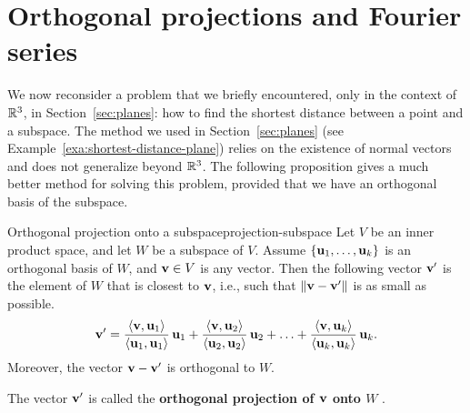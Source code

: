 \section{Orthogonal projections and Fourier series}

We now reconsider a problem that we briefly encountered, only in the
context of $\mathbb{R}^3$, in Section~\ref{sec:planes}: how to find the
shortest distance between a point and a subspace. The method we used
in Section~\ref{sec:planes} (see
Example~\ref{exa:shortest-distance-plane}) relies on the existence of
normal vectors and does not generalize beyond $\mathbb{R}^3$. The following
proposition gives a much better method for solving this problem,
provided that we have an orthogonal basis of the subspace.

\begin{proposition}{Orthogonal projection onto a subspace}{projection-subspace}
  Let $V$ be an inner product space, and let $W$ be a subspace of
  $V$. Assume $\set{\vect{u}_1,\ldots,\vect{u}_k}$ is an orthogonal
  basis of\/ $W$, and $\vect{v}\in V$ is any vector. Then the
  following vector $\vect{v}'$ is the element of $W$ that is closest
  to $\vect{v}$, i.e., such that $\norm{\vect{v}-\vect{v}'}$ is as
  small as possible.
  \begin{equation*}
    \vect{v}' =
    \frac{\iprod{\vect{v},\vect{u}_1}}{\iprod{\vect{u}_1,\vect{u}_1}}\,\vect{u}_1
    + \frac{\iprod{\vect{v},\vect{u}_2}}{\iprod{\vect{u}_2,\vect{u}_2}}\,\vect{u}_2
    + \ldots
    + \frac{\iprod{\vect{v},\vect{u}_k}}{\iprod{\vect{u}_k,\vect{u}_k}}\,\vect{u}_k.
  \end{equation*}
  Moreover, the vector $\vect{v}-\vect{v}'$ is orthogonal to $W$.
  \begin{center}
  \end{center}
  The vector $\vect{v}'$ is called the \textbf{orthogonal projection
    of $\vect{v}$ onto $W$}%
  .
\end{proposition}

